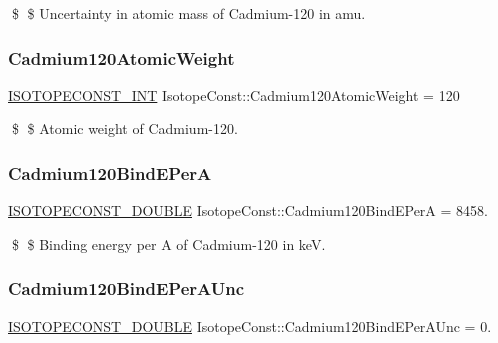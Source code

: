 \$ \$ Uncertainty in atomic mass of Cadmium-\/120 in amu. \mbox{\label{group___isotope_const-_cadmium-_cd120_ga39ac0039d0ee08f0d20321018b355f8c}} 
\subsubsection{\texorpdfstring{Cadmium120\+Atomic\+Weight}{Cadmium120AtomicWeight}}
{\footnotesize\ttfamily \mbox{\hyperlink{group___isotope_const-_macros_ga5f18360b3e99483a35c32d789e62621c}{I\+S\+O\+T\+O\+P\+E\+C\+O\+N\+S\+T\+\_\+\+I\+NT}} Isotope\+Const\+::\+Cadmium120\+Atomic\+Weight = 120}

\$ \$ Atomic weight of Cadmium-\/120. \mbox{\label{group___isotope_const-_cadmium-_cd120_gacdbd4513ef1103cf5031493969f76f54}} 
\subsubsection{\texorpdfstring{Cadmium120\+Bind\+E\+PerA}{Cadmium120BindEPerA}}
{\footnotesize\ttfamily \mbox{\hyperlink{group___isotope_const-_macros_ga8f45a7272ce02c0b4c65c44636ed719a}{I\+S\+O\+T\+O\+P\+E\+C\+O\+N\+S\+T\+\_\+\+D\+O\+U\+B\+LE}} Isotope\+Const\+::\+Cadmium120\+Bind\+E\+PerA = 8458.}

\$ \$ Binding energy per A of Cadmium-\/120 in keV. \mbox{\label{group___isotope_const-_cadmium-_cd120_gab1718316b7effd75d8c657c07efc4da9}} 
\subsubsection{\texorpdfstring{Cadmium120\+Bind\+E\+Per\+A\+Unc}{Cadmium120BindEPerAUnc}}
{\footnotesize\ttfamily \mbox{\hyperlink{group___isotope_const-_macros_ga8f45a7272ce02c0b4c65c44636ed719a}{I\+S\+O\+T\+O\+P\+E\+C\+O\+N\+S\+T\+\_\+\+D\+O\+U\+B\+LE}} Isotope\+Const\+::\+Cadmium120\+Bind\+E\+Per\+A\+Unc = 0.}

